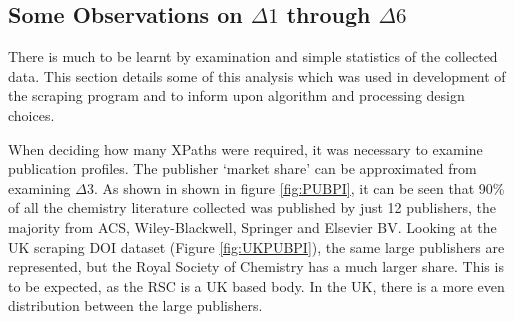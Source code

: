 \subsection{Some Observations on $\Delta1$ through $\Delta6$}
\label{sec:CORPUSOBSERVATIONS}
There is much to be learnt by examination and simple statistics of the collected data. This section details some of this analysis which was used in development of the scraping program and to inform upon algorithm and processing design choices.

When deciding how many XPaths were required, it was necessary to examine publication profiles.
The publisher `market share' can be approximated from examining $\Delta3$.
As shown in  shown in figure \ref{fig:PUBPI}, it can be seen that 90\% of all the chemistry literature collected was published by just 12 publishers, the majority from ACS, Wiley-Blackwell, Springer and Elsevier BV. Looking at the UK scraping DOI dataset (Figure \ref{fig:UKPUBPI}), the same large publishers are represented, but the Royal Society of Chemistry has a much larger share. This is to be expected, as the RSC is a UK based body. In the UK, there is a more even distribution between the large publishers. 


